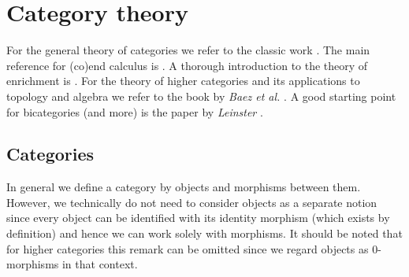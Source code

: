 \chapter{Category theory}\label{chapter:cat}

    For the general theory of categories we refer to the classic work \cite{maclane}. The main reference for (co)end calculus is \cite{end}. A thorough introduction to the theory of enrichment is \cite{kelly}. For the theory of higher categories and its applications to topology and algebra we refer to the book by \textit{Baez et al.} \cite{towards_higher_cat}. A good starting point for bicategories (and more) is the paper by \textit{Leinster} \cite{basic_bicategories}.

\section{Categories}

    \begin{remark}
        In general we define a category by objects and morphisms between them. However, we technically do not need to consider objects as a separate notion since every object can be identified with its identity morphism (which exists by definition) and hence we can work solely with morphisms. It should be noted that for higher categories this remark can be omitted since we regard objects as 0-morphisms in that context.
    \end{remark}



